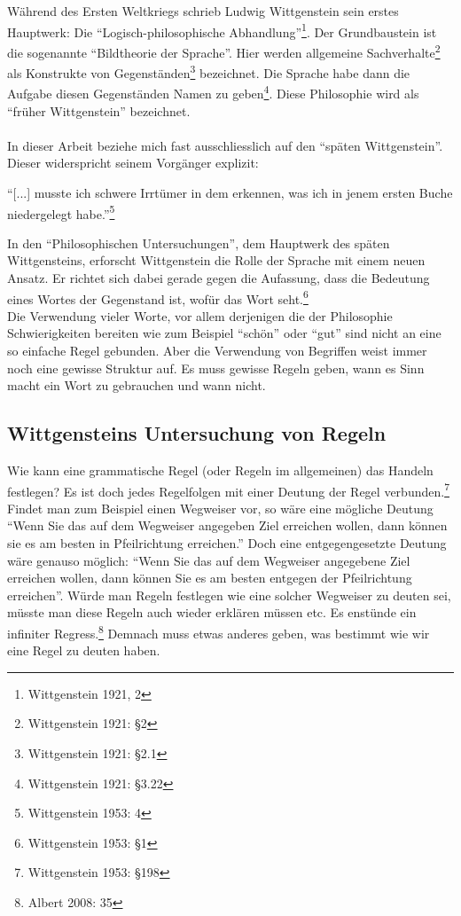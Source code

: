 \documentclass[10pt,a4paper]{article}
\begin{document}
Während des Ersten Weltkriegs schrieb Ludwig Wittgenstein sein erstes Hauptwerk: Die \enquote{Logisch-philosophische Abhandlung}\footnote{Wittgenstein 1921, 2}. Der Grundbaustein ist die sogenannte \enquote{Bildtheorie der Sprache}. Hier werden allgemeine Sachverhalte\footnote{Wittgenstein 1921: §2} als Konstrukte von Gegenständen\footnote{Wittgenstein 1921: §2.1} bezeichnet. Die Sprache habe dann die Aufgabe diesen Gegenständen Namen zu geben\footnote{Wittgenstein 1921: §3.22}. Diese Philosophie wird als \enquote{früher Wittgenstein} bezeichnet. \\
\\
In dieser Arbeit beziehe mich fast ausschliesslich auf den \enquote{späten Wittgenstein}. Dieser widerspricht seinem Vorgänger explizit:
\begin{displayquote}
\enquote{[...] musste ich schwere Irrtümer in dem erkennen, was ich in jenem ersten Buche niedergelegt habe.}\footnote{Wittgenstein 1953: 4}
\end{displayquote}
In den \enquote{Philosophischen Untersuchungen}, dem Hauptwerk des späten Wittgensteins, erforscht Wittgenstein die Rolle der Sprache mit einem neuen Ansatz. Er richtet sich dabei gerade gegen die Aufassung, dass die Bedeutung eines Wortes der Gegenstand ist, wofür das Wort seht.\footnote{Wittgenstein 1953: §1} \\
Die Verwendung vieler Worte, vor allem derjenigen die der Philosophie Schwierigkeiten bereiten wie zum Beispiel \enquote{schön} oder \enquote{gut} sind nicht an eine so einfache Regel gebunden. Aber die Verwendung von Begriffen weist immer noch eine gewisse Struktur auf. Es muss gewisse Regeln geben, wann es Sinn macht ein Wort zu gebrauchen und wann nicht.


\subsection{Wittgensteins Untersuchung von Regeln}
Wie kann eine grammatische Regel (oder Regeln im allgemeinen) das Handeln festlegen? Es ist doch jedes Regelfolgen mit einer Deutung der Regel verbunden.\footnote{Wittgenstein 1953: §198} \\
Findet man zum Beispiel einen Wegweiser vor, so wäre eine mögliche Deutung \enquote{Wenn Sie das auf dem Wegweiser angegeben Ziel erreichen wollen, dann können sie es am besten in Pfeilrichtung erreichen.} Doch eine entgegengesetzte Deutung wäre genauso möglich: \enquote{Wenn Sie das auf dem Wegweiser angegebene Ziel erreichen wollen, dann können Sie es am besten entgegen der Pfeilrichtung erreichen}. Würde man Regeln festlegen wie eine solcher Wegweiser zu deuten sei, müsste man diese Regeln auch wieder erklären müssen etc. Es enstünde ein infiniter Regress.\footnote{Albert 2008: 35} Demnach muss etwas anderes geben, was bestimmt wie wir eine Regel zu deuten haben.
\end{document}
